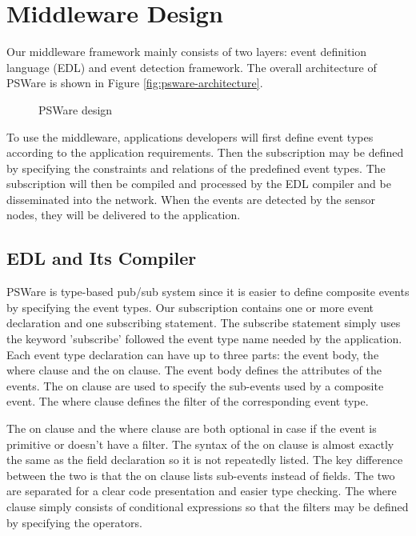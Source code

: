 \section{Middleware Design}
\label{sec:design}

Our middleware framework mainly consists of two layers: event definition language (EDL) and event detection framework. The overall architecture of PSWare is shown in Figure \ref{fig:psware-architecture}.

\begin{figure}
\centering
{}
\caption{PSWare design}
\label{fig:psware-design}
\end{figure}

To use the middleware, applications developers will first define event types according to the application requirements. Then the subscription may be defined by specifying the constraints and relations of the predefined event types. The subscription will then be compiled and processed by the EDL compiler and be disseminated into the network. When the events are detected by the sensor nodes, they will be delivered to the application.

\subsection{EDL and Its Compiler}
PSWare is type-based \cite{facespubsub} pub/sub system since it is easier to define composite events by specifying the event types. Our subscription contains one or more event declaration and one subscribing statement. The subscribe statement simply uses the keyword 'subscribe' followed the event type name needed by the application. Each event type declaration can have up to three parts: the event body, the where clause and the on clause. The event body defines the attributes of the events. The on clause are used to specify the sub-events used by a composite event. The where clause defines the filter of the corresponding event type.

The on clause and the where clause are both optional in case if the event is primitive or doesn't have a filter. The syntax of the on clause is almost exactly the same as the field declaration so it is not repeatedly listed. The key difference between the two is that the on clause lists sub-events instead of fields. The two are separated for a clear code presentation and easier type checking. The where clause simply consists of conditional expressions so that the filters may be defined by specifying the operators.

